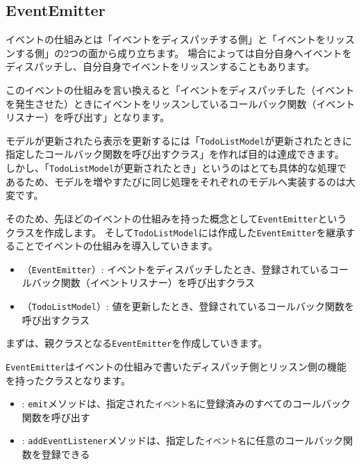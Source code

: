 \hypertarget{event-emitter}{%
\subsection{EventEmitter}\label{event-emitter}}

イベントの仕組みとは「イベントをディスパッチする側」と「イベントをリッスンする側」の2つの面から成り立ちます。
場合によっては自分自身へイベントをディスパッチし、自分自身でイベントをリッスンすることもあります。

このイベントの仕組みを言い換えると「イベントをディスパッチした（イベントを発生させた）ときにイベントをリッスンしているコールバック関数（イベントリスナー）を呼び出す」となります。

モデルが更新されたら表示を更新するには「\texttt{TodoListModel}が更新されたときに指定したコールバック関数を呼び出すクラス」を作れば目的は達成できます。
しかし、「\texttt{TodoListModel}が更新されたとき」というのはとても具体的な処理であるため、モデルを増やすたびに同じ処理をそれぞれのモデルへ実装するのは大変です。

そのため、先ほどのイベントの仕組みを持った概念として\texttt{EventEmitter}というクラスを作成します。
そして\texttt{TodoListModel}には作成した\texttt{EventEmitter}を継承することでイベントの仕組みを導入していきます。

\begin{itemize}
\item
  （\texttt{EventEmitter}）: 
  イベントをディスパッチしたとき、登録されているコールバック関数（イベントリスナー）を呼び出すクラス
\item
  （\texttt{TodoListModel}）: 
  値を更新したとき、登録されているコールバック関数を呼び出すクラス
\end{itemize}

まずは、親クラスとなる\texttt{EventEmitter}を作成していきます。

\texttt{EventEmitter}はイベントの仕組みで書いたディスパッチ側とリッスン側の機能を持ったクラスとなります。

\begin{itemize}
\item
  :
  \texttt{emit}メソッドは、指定された\texttt{イベント名}に登録済みのすべてのコールバック関数を呼び出す
\item
  :
  \texttt{addEventListener}メソッドは、指定した\texttt{イベント名}に任意のコールバック関数を登録できる
\end{itemize}

